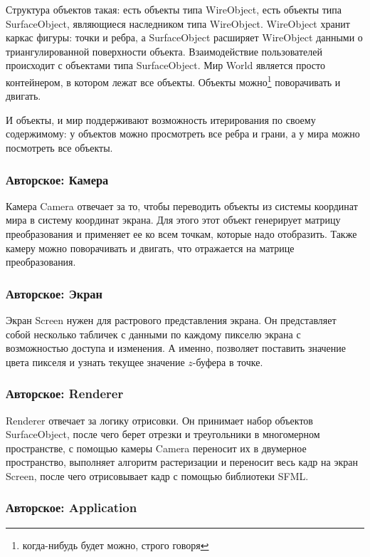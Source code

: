 \documentclass{article}
\begin{document}
Структура объектов такая: есть объекты типа WireObject, есть объекты типа SurfaceObject, являющиеся наследником типа WireObject. WireObject хранит каркас фигуры: точки и ребра, а SurfaceObject расширяет WireObject данными о триангулированной поверхности объекта. Взаимодействие пользователей происходит с объектами типа SurfaceObject. Мир World является просто контейнером, в котором лежат все объекты. Объекты можно\footnote{ когда-нибудь будет можно, строго говоря} поворачивать и двигать.

И объекты, и мир поддерживают возможность итерирования по своему содержимому: у объектов можно просмотреть все ребра и грани, а у мира можно посмотреть все объекты.

\subsubsection{Авторское: Камера}

Камера Camera отвечает за то, чтобы переводить объекты из системы координат мира в систему координат экрана. Для этого этот объект генерирует матрицу преобразования и применяет ее ко всем точкам, которые надо отобразить. Также камеру можно поворачивать и двигать, что отражается на матрице преобразования.

\subsubsection{Авторское: Экран}

Экран Screen нужен для растрового представления экрана. Он представляет собой несколько табличек с данными по каждому пикселю экрана с возможностью доступа и изменения. А именно, позволяет поставить значение цвета пикселя и узнать текущее значение $z$-буфера в точке.

\subsubsection{Авторское: Renderer}

Renderer отвечает за логику отрисовки. Он принимает набор объектов SurfaceObject, после чего берет отрезки и треугольники в многомерном пространстве, с помощью камеры Camera переносит их в двумерное пространство, выполняет алгоритм растеризации и переносит весь кадр на экран Screen, после чего отрисовывает кадр с помощью библиотеки SFML. 

\subsubsection{Авторское: Application}
\end{document}
